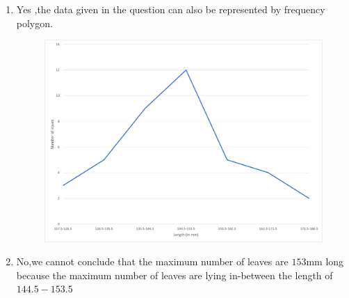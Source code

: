 \documentclass[12pt,twocolumn]{IEEEtran}
\begin{document}
\begin{enumerate}[label=(\roman*)]
\begin{figure}[ht!]
	      \end{figure}
		  \pagebreak
	\item Yes ,the data given in the question can also be represented by frequency polygon.
	\begin{figure}[ht!]
		\begin{center}
			\includegraphics[width=\columnwidth]{fig/Picture2.png}
			\caption{}
			\label{fig:fig2}
		\end{center}

	\end{figure}
	\item No,we cannot conclude that the maximum number of leaves are $153$mm long because the maximum number of leaves are lying in-between the length of $144.5-153.5$


\end{enumerate}
\end{document}
